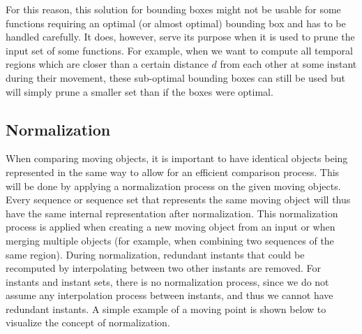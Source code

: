For this reason, this solution for bounding boxes might not be usable for some functions requiring an optimal (or almost optimal) bounding box and has to be handled carefully. It does, however, serve its purpose when it is used to prune the input set of some functions. For example, when we want to compute all temporal regions which are closer than a certain distance $d$ from each other at some instant during their movement, these sub-optimal bounding boxes can still be used but will simply prune a smaller set than if the boxes were optimal.

\subsection{Normalization}
\label{section:normalization}

When comparing moving objects, it is important to have identical objects being represented in the same way to allow for an efficient comparison process. This will be done by applying a normalization process on the given moving objects. Every sequence or sequence set that represents the same moving object will thus have the same internal representation after normalization. This normalization process is applied when creating a new moving object from an input or when merging multiple objects (for example, when combining two sequences of the same region). During normalization, redundant instants that could be recomputed by interpolating between two other instants are removed. For instants and instant sets, there is no normalization process, since we do not assume any interpolation process between instants, and thus we cannot have redundant instants. A simple example of a moving point is shown below to visualize the concept of normalization.

